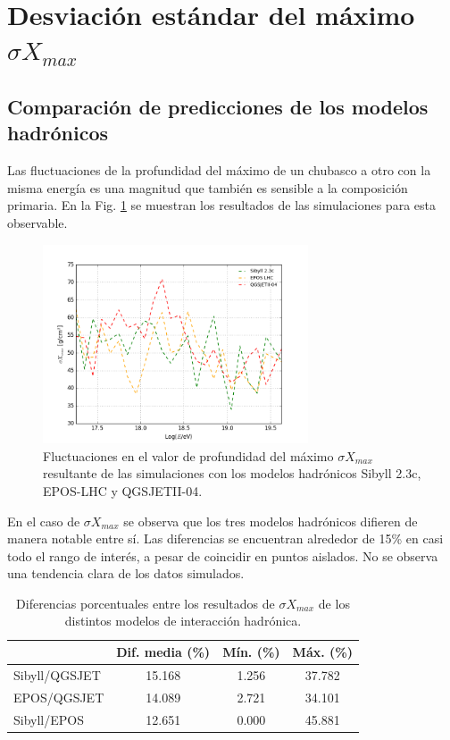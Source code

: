 \section{Desviación estándar del máximo $\sigma X_{max}$}
\subsection{Comparación de predicciones de los modelos hadrónicos}
Las fluctuaciones de la profundidad del máximo de un chubasco a otro con la misma energía es una magnitud que también es sensible a la composición primaria. En la Fig. \ref{fig:Smodelos} se muestran los resultados de las simulaciones para esta observable. \\

\begin{figure}[h]
\centering
\includegraphics[width=0.7\textwidth]{Figuras/StddvXmax_modelos} 
\caption{Fluctuaciones en el valor de profundidad del máximo $\sigma X_{max}$ resultante de las simulaciones con los modelos hadrónicos Sibyll 2.3c, EPOS-LHC y QGSJETII-04.}
\label{fig:Smodelos}
\end{figure}	

En el caso de $\sigma X_{max}$ se observa que los tres modelos hadrónicos difieren de manera notable entre sí. Las diferencias se encuentran alrededor de 15\% en casi todo el rango de interés, a pesar de coincidir en puntos aislados. No se observa una tendencia clara de los datos simulados.

\begin{table}[h]
\centering
\caption{Diferencias porcentuales entre los resultados de $\sigma X_{max}$ de los distintos modelos de interacción hadrónica.}
\begin{tabular}{l|ccc}
\hline
              & Dif. media (\%) & Mín. (\%) & Máx. (\%) \\ \hline
Sibyll/QGSJET & 15.168          & 1.256     & 37.782    \\ \hline
EPOS/QGSJET   & 14.089          & 2.721     & 34.101    \\ \hline
Sibyll/EPOS   & 12.651          & 0.000     & 45.881    \\ \hline
\end{tabular}
\end{table}

